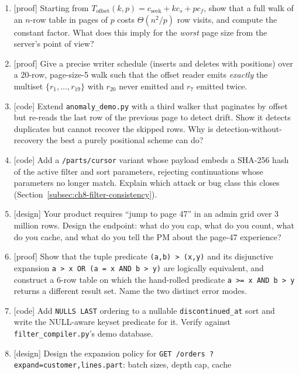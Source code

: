 \begin{enumerate}[label=\textbf{E8.\arabic*.}]
  \item {[proof]} Starting from $T_{\mathrm{offset}}(k,p) = c_{\mathrm{seek}}
        + k c_s + p c_f$, show that a full walk of an $n$-row table in pages
        of $p$ costs $\Theta(n^2/p)$ row visits, and compute the constant
        factor. What does this imply for the \emph{worst} page size from the
        server's point of view?
  \item {[proof]} Give a precise writer schedule (inserts and deletes with
        positions) over a 20-row, page-size-5 walk such that the offset
        reader emits \emph{exactly} the multiset
        $\{r_1,\ldots,r_{19}\}$ with $r_{20}$ never emitted and $r_7$
        emitted twice.
  \item {[code]} Extend \texttt{anomaly\_demo.py} with a third walker that
        paginates by offset but re-reads the last row of the previous page
        to detect drift. Show it detects duplicates but cannot recover the
        skipped rows. Why is detection-without-recovery the best a purely
        positional scheme can do?
  \item {[code]} Add a \texttt{/parts/cursor} variant whose payload embeds a
        SHA-256 hash of the active filter and sort parameters, rejecting
        continuations whose parameters no longer match. Explain which attack
        or bug class this closes (Section~\ref{subsec:ch8-filter-consistency}).
  \item {[design]} Your product requires ``jump to page 47'' in an admin
        grid over 3 million rows. Design the endpoint: what do you cap, what
        do you count, what do you cache, and what do you tell the PM about
        the page-47 experience?
  \item {[proof]} Show that the tuple predicate \texttt{(a,b) > (x,y)} and
        its disjunctive expansion \texttt{a > x OR (a = x AND b > y)} are
        logically equivalent, and construct a 6-row table on which the
        hand-rolled predicate \texttt{a >= x AND b > y} returns a different
        result set. Name the two distinct error modes.
  \item {[code]} Add \texttt{NULLS LAST} ordering to a nullable
        \texttt{discontinued\_at} sort and write the NULL-aware keyset
        predicate for it. Verify against \texttt{filter\_compiler.py}'s
        demo database.
  \item {[design]} Design the expansion policy for \texttt{GET /orders
        ?expand=customer,lines.part}: batch sizes, depth cap, cache

\end{enumerate}
